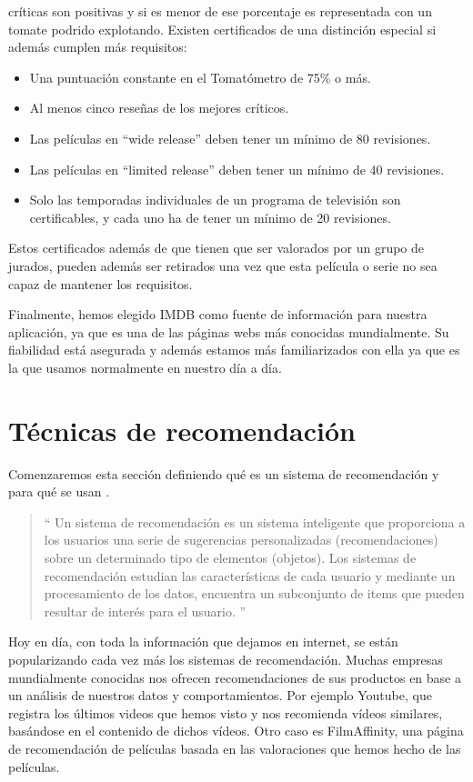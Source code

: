 \begin{itemize}
     críticas son positivas y si es menor de ese porcentaje es representada con
     un tomate podrido explotando.
    Existen certificados de una distinción especial si además cumplen más
     requisitos:
     \begin{itemize}
         \item Una puntuación constante en el Tomatómetro de 75\% o más.
         \item Al menos cinco reseñas de los mejores críticos.
         \item Las películas en ``wide release'' deben tener un mínimo de 80 revisiones.
         \item Las películas en ``limited release'' deben tener un mínimo de 40 revisiones.
         \item Solo las temporadas individuales de un programa de televisión son certificables, y cada uno ha de tener un mínimo de 20 revisiones.
     \end{itemize}
    Estos certificados además de que tienen que ser valorados por un grupo de jurados, pueden además ser retirados una vez que esta película o serie
    no sea capaz de mantener los requisitos.
\end{itemize}

Finalmente, hemos elegido IMDB como fuente de información para nuestra aplicación, ya que es una de las páginas webs más conocidas mundialmente. Su fiabilidad está asegurada y
además estamos más familiarizados con ella ya que es la que usamos normalmente en nuestro día a día.

\section{Técnicas de recomendación}
\label{makereference2.3}
Comenzaremos esta sección definiendo qué es un sistema de recomendación y para qué se usan \cite{filtrahibrido}.
\begin{quote}
``
Un sistema de recomendación es un sistema inteligente que proporciona a los usuarios una serie de 
sugerencias personalizadas (recomendaciones) sobre un determinado tipo de elementos (objetos). Los 
sistemas de recomendación estudian las características de cada usuario y mediante un procesamiento 
de los datos, encuentra un subconjunto de items que pueden resultar de interés para el usuario. 
''
\end{quote}

Hoy en día, con toda la información que dejamos en internet, se están popularizando cada vez más los sistemas de recomendación.
Muchas empresas mundialmente conocidas nos ofrecen recomendaciones de sus productos en base a un análisis de nuestros datos y comportamientos.
Por ejemplo Youtube, que registra los últimos videos que hemos visto y nos recomienda vídeos similares, basándose en el contenido de dichos vídeos. Otro caso es FilmAffinity, 
una página de recomendación de películas basada en las valoraciones que hemos hecho de las películas.

